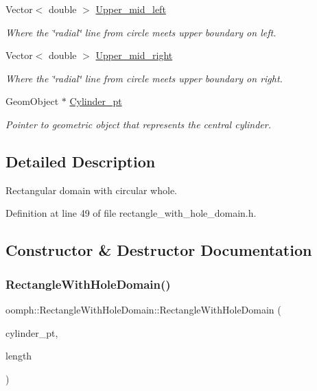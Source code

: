 \begin{DoxyCompactItemize}
Vector$<$ double $>$ \hyperlink{classoomph_1_1RectangleWithHoleDomain_a025fb05e2f6905e62459ecd45ed389e2}{Upper\+\_\+mid\+\_\+left}
\begin{DoxyCompactList}\small\item\em Where the \char`\"{}radial\char`\"{} line from circle meets upper boundary on left. \end{DoxyCompactList}\item 
Vector$<$ double $>$ \hyperlink{classoomph_1_1RectangleWithHoleDomain_aa38db31456f7dd847e13d03d96fc99aa}{Upper\+\_\+mid\+\_\+right}
\begin{DoxyCompactList}\small\item\em Where the \char`\"{}radial\char`\"{} line from circle meets upper boundary on right. \end{DoxyCompactList}\item 
Geom\+Object $\ast$ \hyperlink{classoomph_1_1RectangleWithHoleDomain_a4ca65e1f063e65c4254a594db66fabf8}{Cylinder\+\_\+pt}
\begin{DoxyCompactList}\small\item\em Pointer to geometric object that represents the central cylinder. \end{DoxyCompactList}\end{DoxyCompactItemize}


\subsection{Detailed Description}
Rectangular domain with circular whole. 

Definition at line 49 of file rectangle\+\_\+with\+\_\+hole\+\_\+domain.\+h.



\subsection{Constructor \& Destructor Documentation}
\mbox{\label{classoomph_1_1RectangleWithHoleDomain_a3c685f6d35bb842d50062ccaa63a5486}} 
\subsubsection{\texorpdfstring{Rectangle\+With\+Hole\+Domain()}{RectangleWithHoleDomain()}}
{\footnotesize\ttfamily oomph\+::\+Rectangle\+With\+Hole\+Domain\+::\+Rectangle\+With\+Hole\+Domain (\begin{DoxyParamCaption}\item[{Geom\+Object $\ast$}]{cylinder\+\_\+pt,  }\item[{const double \&}]{length }\end{DoxyParamCaption})\hspace{0.3cm}{\ttfamily [inline]}}




